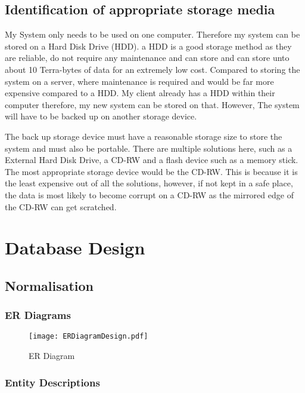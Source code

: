 \begin{python}
\subsection{Identification of appropriate storage media}

My System only needs to be used on one computer. Therefore my system can be stored on a Hard Disk Drive (HDD). a HDD is a good storage method as they are reliable, do not require any maintenance and can store and can store unto about 10 Terra-bytes of data for an extremely low cost. Compared to storing the system on a server, where maintenance is required and would be far more expensive compared to a HDD. My client already has a HDD within their computer therefore, my new system can be stored on that. However, The system will have to be backed up on another storage device. \par

The back up storage device must have a reasonable storage size to store the system and must also be portable. There are multiple solutions here, such as a External Hard Disk Drive, a CD-RW and a flash device such as a memory stick.  The most appropriate storage device would be the CD-RW. This is because it is the least expensive out of all the solutions, however, if not kept in a safe place, the data is most likely to become corrupt on a CD-RW as the mirrored edge of the CD-RW can get scratched. \par

\section{Database Design}

\subsection{Normalisation}

\subsubsection{ER Diagrams}

\begin{figure}[H]
\caption{ER Diagram} \label{fig:ER Diagram}
\hfill\texttt{[image: ERDiagramDesign.pdf]}\hspace*{\fill}
\end{figure}

\subsubsection{Entity Descriptions}


\end{python}
